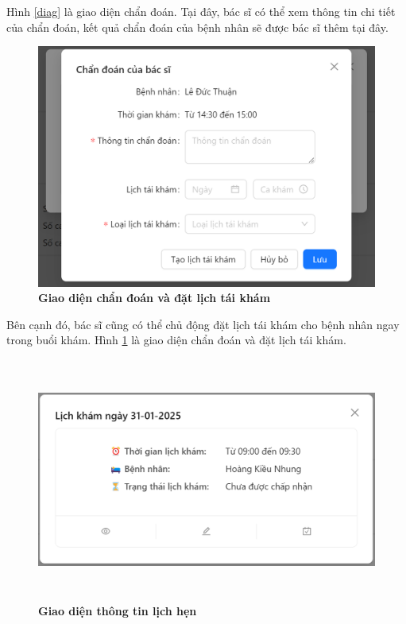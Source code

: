 Hình \ref{diag} là giao diện chẩn đoán. Tại đây, bác sĩ có thể xem thông tin chi tiết của chẩn đoán, kết quả chẩn đoán của bệnh nhân sẽ được bác sĩ thêm tại đây.

\begin{figure}[H]
	\centering
	\includegraphics[width=15cm,height=8cm]{Images/doctor_ui/diag_reschedule.png}
	\caption[Giao diện chẩn đoán và đặt lịch tái khám]{\bfseries \fontsize{12pt}{0pt}\selectfont Giao diện chẩn đoán và đặt lịch tái khám}
	\label{diag_reschedule}
\end{figure}

Bên cạnh đó, bác sĩ cũng có thể chủ động đặt lịch tái khám cho bệnh nhân ngay trong buổi khám. Hình \ref{diag_reschedule} là giao diện chẩn đoán và đặt lịch tái khám.

\begin{figure}[H]
	\centering
	\includegraphics[width=15cm,height=8cm]{Images/doctor_ui/schedule-detail.png}
	\caption[Giao diện thông tin lịch hẹn]{\bfseries \fontsize{12pt}{0pt}\selectfont Giao diện thông tin lịch hẹn}
	\label{schedule-detail-doctor}
\end{figure}

